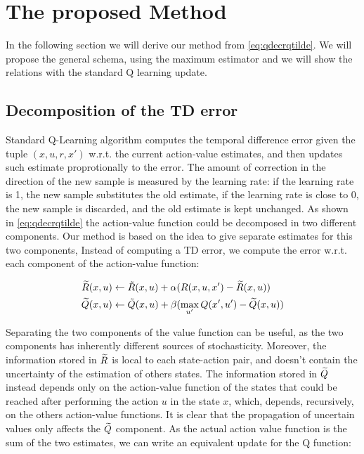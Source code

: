 \documentclass[conference]{IEEEtran}
\begin{document}
\section{The proposed Method}

In the following section we will derive our method from \ref{eq:qdecrqtilde}. We will propose the general schema, using the maximum estimator and we will show the relations with the standard Q learning update.

\subsection{Decomposition of the TD error}

Standard Q-Learning algorithm computes the temporal difference error given the tuple $(x,u,r,x')$ w.r.t. the current action-value estimates, and then updates such estimate proprotionally to the error. The amount of correction in the direction of the new sample is measured by the learning rate: if the learning rate is 1, the new sample substitutes the old estimate, if the learning rate is close to 0, the new sample is discarded, and the old estimate is kept unchanged. 
As shown in \ref{eq:qdecrqtilde} the action-value function could be decomposed in two different components. Our method is based on the idea to give separate estimates for this two components,
Instead of computing a TD error, we compute the error w.r.t. each component of the action-value function:

\begin{align}
\Rtilde(x,u) & \leftarrow\tilde{R}(x,u)+\alpha(R(x,u,x')-\Rtilde(x,u)) \label{eq:rtilupdedate}\\
\Qtilde(x,u) & \leftarrow\tilde{Q}(x,u)+\beta(\max_{u'}Q(x',u')-\Qtilde(x,u))
\label{eq:qtildeupdate}
\end{align}

Separating the two components of the value function can be useful, as the two components has inherently different sources of stochasticity. Moreover, the information stored in $\widetilde{R}$ is local to each state-action pair, and doesn't contain the uncertainty of the estimation of others states. The information stored in $\widetilde{Q}$ instead depends only on the action-value function of the states that could be reached after performing the action $u$ in the state $x$, which, depends, recursively, on the others action-value functions. It is clear that the propagation of uncertain values only affects the $\widetilde{Q}$ component.
As the actual action value function is the sum of the two estimates, we can write an equivalent update for the Q function:
\end{document}
